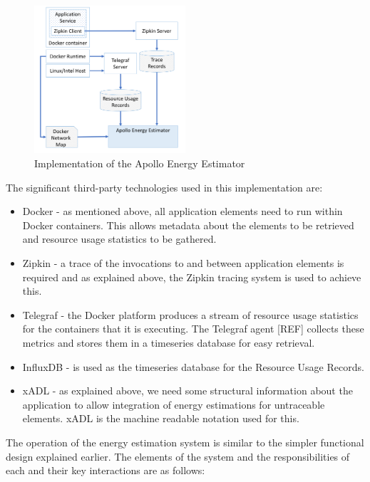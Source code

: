 \begin{figure}
\centering
\includegraphics[width=0.5\textwidth]{Figures/implementation-design}
\caption{Implementation of the Apollo Energy Estimator}
\label{figure:implementation}
\end{figure}

The significant third-party technologies used in this implementation are:
\begin{itemize}
\item Docker - as mentioned above, all application elements need to run within Docker containers.  This allows metadata about the elements to be retrieved and resource usage statistics to be gathered.
\item Zipkin - a trace of the invocations to and between application elements is required and as explained above, the Zipkin tracing system is used to achieve this.
\item Telegraf - the Docker platform produces a stream of resource usage statistics for the containers that it is executing.  The Telegraf agent [REF] collects these metrics and stores them in a timeseries database for easy retrieval.
\item InfluxDB - is used as the timeseries database for the Resource Usage Records.
\item xADL - as explained above, we need some structural information about the application to allow integration of energy estimations for untraceable elements.  xADL is the machine readable notation used for this.
\end{itemize}

The operation of the energy estimation system is similar to the simpler functional design explained earlier.  The elements of the system and the responsibilities of each and their key interactions are as follows:

